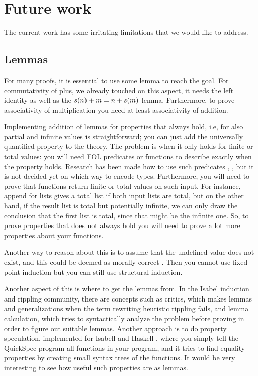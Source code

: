\section{Future work}

The current work has some irritating limitations that we would like to address.

\subsection{Lemmas}

For many proofs, it is essential to use some lemma to reach the
goal. For commutativity of plus, we already touched on this aspect, it
needs the left identity as well as the $s(n) + m = n + s(m)$
lemma. Furthermore, to prove associativity of multiplication you need
at least associativity of addition.

Implementing addition of lemmas for properties that always hold, i.e,
for also partial and infinite values is straightforward; you can just
add the universally quantified property to the theory. The problem is
when it only holds for finite or total values: you will need FOL
predicates or functions to describe exactly when the property
holds. Research has been made how to use such predicates
\cite{sortMonotonicity}, \cite{polyMonotonicity}, but it is not
decided yet on which way to encode types. Furthermore, you will need
to prove that functions return finite or total values on such
input. For instance, append for lists gives a total list if both input
lists are total, but on the other hand, if the result list is total
but potentially infinite, we can only draw the conclusion that the
first list is total, since that might be the infinite one. So, to
prove properties that does not always hold you will need to prove a
lot more properties about your functions.

Another way to reason about this is to assume that the undefined value
does not exist, and this could be deemed as morally correct
\cite{fastandloose}. Then you cannot use fixed point induction but you
can still use structural induction.

Another aspect of this is where to get the lemmas from. In the Isabel
induction and rippling community, there are concepts such as critics,
which makes lemmas and generalizations when the term rewriting
heuristic rippling fails, and lemma calculation, which tries to
syntactically analyze the problem before proving in order to figure
out suitable lemmas. Another approach is to do property speculation,
implemented for Isabell \cite{isacosy} and Haskell \cite{quickspec},
where you simply tell the QuickSpec program all functions in your
program, and it tries to find equality properties by creating small syntax
trees of the functions. It would be very interesting to see how useful
such properties are as lemmas.

